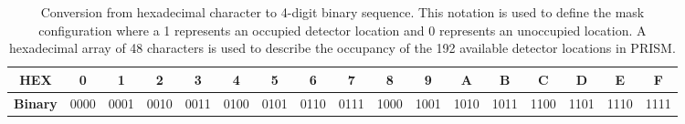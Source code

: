 \documentclass[10pt]{article}
\renewcommand{\thetable}{\Roman{table}}
\begin{document}
\begin{table}[htb!]
\renewcommand\thetable{C.1}
\setlength{\tabcolsep}{3.5pt}
\begin{tabular}{|c||c|c|c|c|c|c|c|c|c|c|c|c|c|c|c|c|}
\hline
\textbf{HEX} & 0 & 1 & 2 & 3 & 4 & 5 & 6 & 7 & 8 & 9 & A & B & C & D & E & F  \\ \hline
\textbf{Binary} & 0000 & 0001 & 0010 & 0011 & 0100 & 0101 & 0110 & 0111 & 1000 & 1001 & 1010 & 1011 & 1100 & 1101 & 1110 & 1111 \\ \hline
\end{tabular}
\caption{Conversion from hexadecimal character to 4-digit binary sequence. This notation is used to define the mask configuration where a 1 represents an occupied detector location and 0 represents an unoccupied location. A hexadecimal array of 48 characters is used to describe the occupancy of the 192 available detector locations in PRISM. \\ [-4ex]}
\end{table}






\end{document}
